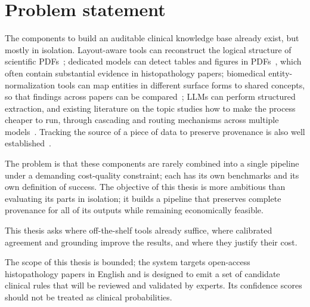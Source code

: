 \section{Problem statement}\label{section:intro-problem-statement}

The components to build an auditable clinical knowledge base already exist, but mostly in isolation. Layout-aware tools can reconstruct the logical structure of scientific PDFs~\parencite{ramakrishnan2012layoutawaretextextraction, wang2024detectorderconstructtreeconstruction}; dedicated models can detect tables and figures in PDFs~\parencite{smock2022pubtables1mcomprehensivetable, clark2015extractingfigurestables}, which often contain substantial evidence in histopathology papers; biomedical entity-normalization tools can map entities in different surface forms to shared concepts, so that findings across papers can be compared~\parencite{neumann2019scispacy, bodenreider2004umls}; LLMs can perform structured extraction, and existing literature on the topic studies how to make the process cheaper to run, through cascading and routing mechanisms across multiple models~\parencite{chen2023frugalgpt, kolawole2025abc, soiffer2025semantic}. Tracking the source of a piece of data to preserve provenance is also well established~\parencite{simmhan2005surveydataprovenance}. 

The problem is that these components are rarely combined into a single pipeline under a demanding cost-quality constraint; each has its own benchmarks and its own definition of success. The objective of this thesis is more ambitious than evaluating its parts in isolation; it builds a pipeline that preserves complete provenance for all of its outputs while remaining economically feasible. 

This thesis asks where off-the-shelf tools already suffice, where calibrated agreement and grounding improve the results, and where they justify their cost.

The scope of this thesis is bounded; the system targets open-access histopathology papers in English and is designed to emit a set of candidate clinical rules that will be reviewed and validated by experts. Its confidence scores should not be treated as clinical probabilities. 